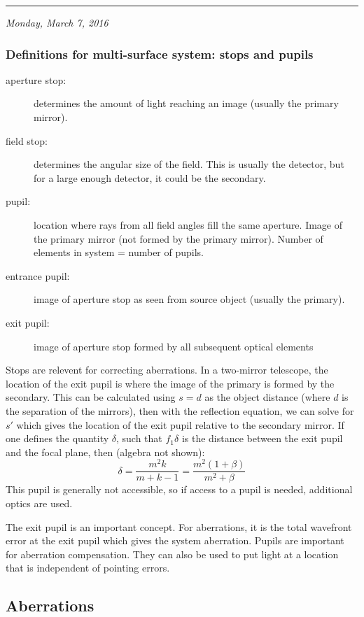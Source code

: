 \documentclass[12pt]{article}
\newcommand{\mydate}[1]{
    \begin{flushright}
        \rule{\textwidth}{0.4pt} %
        \footnotesize\hfill\textit{#1}
    \end{flushright}}
\begin{document}
\mydate{Monday, March 7, 2016}
\subsubsection{Definitions for multi-surface system: stops and pupils}
\begin{description}
    \item [aperture stop:] determines the amount of light reaching an
        image (usually the primary mirror).
    \item [field stop:] determines the angular size of the field. This
        is usually the detector, but for a large enough detector, it
        could be the secondary.
    \item [pupil:] location where rays from all field angles fill the
        same aperture. Image of the primary mirror (not formed by
        the primary mirror). Number of elements in system = number
        of pupils.
    \item [entrance pupil:] image of aperture stop as seen from source
        object (usually the primary).
    \item [exit pupil:] image of aperture stop formed by all subsequent
        optical elements
\end{description}
Stops are relevent for correcting aberrations.
In a two-mirror telescope, the location of the exit pupil is where the
image of the primary is formed by the secondary. This can be calculated
using $s=d$ as the object distance (where $d$ is the separation of the
mirrors), then with the reflection equation, we can solve for $s'$
which gives the location of the exit pupil relative to the secondary
mirror. If one defines the quantity $\delta$, such that $f_{1}\delta$
is the distance between the exit pupil and the focal plane,
then (algebra not shown):
\[
    \delta = \frac{m^{2}k}{m+k-1} = \frac{m^{2}(1+\beta)}{m^{2}+\beta}
    \]
This pupil is generally not accessible, so if access to a pupil is
needed, additional optics are used.

The exit pupil is an important concept. For aberrations, it is the total
wavefront error at the exit pupil which gives the system aberration. Pupils are
important for aberration compensation. They can also be used to put light at a
location that is independent of pointing errors.

\subsection{Aberrations}\label{ab}
\end{document}
